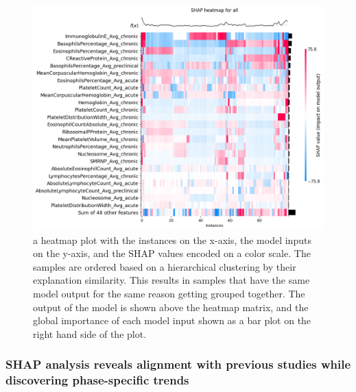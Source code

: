 \documentclass[final,3p,times,authoryear]{elsarticle}
\begin{document}
\begin{figure}[t] 
    \centering
    \includegraphics[width=\textwidth]{figures/heatmap_all_orderx.png}
    \caption{a heatmap plot with the instances on the x-axis, the model inputs on the y-axis, and the SHAP values encoded on a color scale. The samples are ordered based on a hierarchical clustering by their explanation similarity. This results in samples that have the same model output for the same reason getting grouped together. The output of the model is shown above the heatmap matrix, and the global importance of each model input shown as a bar plot on the right hand side of the plot.}\label{heatmap_all_orderx}
\end{figure}


\subsubsection{SHAP analysis reveals alignment with previous studies while discovering phase-specific trends}
\end{document}
